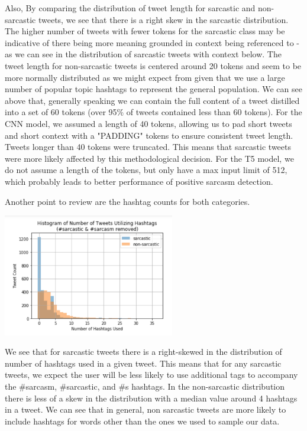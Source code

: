 \documentclass[11pt,a4paper]{article}
\begin{document}
Also, By comparing the distribution of tweet length for sarcastic and non-sarcastic tweets, we see that there is a right skew in the sarcastic distribution. The higher number of tweets with fewer tokens for the sarcastic class may be indicative of there being more meaning grounded in context being referenced to - as we can see in the distribution of sarcastic tweets with context below. The tweet length for non-sarcastic tweets is centered around 20 tokens and seem to be more normally distributed as we might expect from given that we use a large number of popular topic hashtags to represent the general population. We can see above that, generally speaking we can contain the full content of a tweet distilled into a set of 60 tokens (over 95\% of tweets contained less than 60 tokens). For the CNN model, we assumed a length of 40 tokens, allowing us to pad short tweets and short context with a "PADDING" tokens to ensure consistent tweet length. Tweets longer than 40 tokens were truncated. This means that sarcastic tweets were more likely affected by this methodological decision. For the T5 model, we do not assume a length of the tokens, but only have a max input limit of 512, which probably leads to better performance of positive sarcasm detection.

Another point to review are the hashtag counts for both categories. 

\includegraphics[width=75mm,scale=0.5]{hashtag_histogram.png}

We see that for sarcastic tweets there is a right-skewed in the distribution of number of hashtags used in a given tweet. This means that for any sarcastic tweets, we expect the user will be less likely to use additional tags to accompany the \#sarcasm, \#sarcastic, and \#s hashtags. In the non-sarcastic distribution there is less of a skew in the distribution with a median value around 4 hashtags in a tweet. We can see that in general, non sarcastic tweets are more likely to include hashtags for words other than the ones we used to sample our data. 
\end{document}
